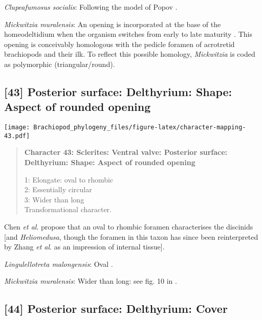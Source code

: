 \documentclass[openany]{book}
\theoremstyle{definition}
\theoremstyle{definition}
\theoremstyle{definition}
\theoremstyle{remark}
\begin{document}
\hypertarget{Clupeafumosus_socialis-coding-42}{}
\emph{Clupeafumosus socialis}: Following the model of Popov
\citeyearpar{Popov1992TheCambrian}.

\hypertarget{Mickwitzia_muralensis-coding-42}{}
\emph{Mickwitzia muralensis}: An opening is incorporated at the base of
the homeodeltidium when the organism switches from early to late
maturity \citep[fig. 10 in][]{Balthasar2004Shellstructure}. This opening
is conceivably homologous with the pedicle foramen of acrotretid
brachiopods and their ilk. To reflect this possible homology,
\emph{Mickwitzia} is coded as polymorphic (triangular/round).

\subsection*{{[}43{]} Posterior surface: Delthyrium: Shape: Aspect of
rounded
opening}\label{posterior-surface-delthyrium-shape-aspect-of-rounded-opening}

\texttt{[image: Brachiopod\_phylogeny\_files/figure-latex/character-mapping-43.pdf]}

\begin{quote}
\textbf{Character 43: Sclerites: Ventral valve: Posterior surface:
Delthyrium: Shape: Aspect of rounded opening}

1: Elongate: oval to rhombic\\
2: Essentially circular\\
3: Wider than long\\
Transformational character.
\end{quote}

Chen \emph{et al}. \citeyearpar{Chen2007Reinterpretationof} propose that
an oval to rhombic foramen characterises the discinids {[}and
\emph{Heliomedusa}, though the foramen in this taxon has since been
reinterpreted by Zhang \emph{et al}.
\citeyearpar{Zhang2009Architectureand} as an impression of internal
tissue{]}.

\hypertarget{Lingulellotreta_malongensis-coding-43}{}
\emph{Lingulellotreta malongensis}: Oval
\citep{Williams2000LinguliformeaCraniiformea}.

\hypertarget{Mickwitzia_muralensis-coding-43}{}
\emph{Mickwitzia muralensis}: Wider than long: see fig. 10 in
\citet{Balthasar2004Shellstructure}.

\subsection*{{[}44{]} Posterior surface: Delthyrium:
Cover}\label{posterior-surface-delthyrium-cover}
\end{document}
